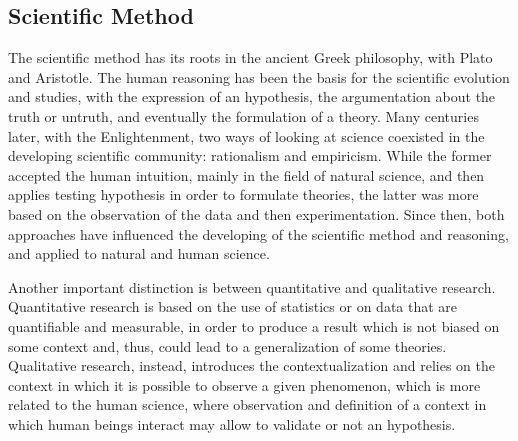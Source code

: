 \documentclass[12pt]{article}
\begin{document}
\subsection{Scientific Method}
\label{sub:sciMeth}

The scientific method has its roots in the ancient Greek philosophy, with Plato and Aristotle. The human reasoning has been the basis for the scientific evolution and studies, with the expression of an hypothesis, the argumentation about the truth or untruth, and eventually the formulation of a theory. Many centuries later, with the Enlightenment, two ways of looking at science coexisted in the developing scientific community: rationalism and empiricism. While the former accepted the human intuition, mainly in the field of natural science, and then applies testing hypothesis in order to formulate theories, the latter was more based on the observation of the data and then experimentation. Since then, both approaches have influenced the developing of the scientific method and reasoning, and applied to natural and human science.\cite{carroll}

Another important distinction is between quantitative and qualitative research. Quantitative research is based on the use of statistics or on data that are quantifiable and measurable, in order to produce a result which is not biased on some context and, thus, could lead to a generalization of some theories. Qualitative research, instead, introduces the contextualization and relies on the context in which it is possible to observe a given phenomenon, which is more related to the human science, where observation and definition of a context in which human beings interact may allow to validate or not an hypothesis.\cite{kaplan}
\end{document}
